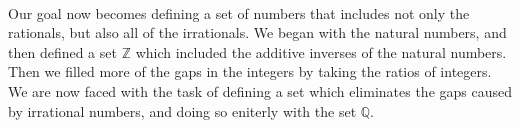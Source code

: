 \documentclass{article}
\newcommand{\Q}{\mathbb{Q}}
\newcommand{\Z}{\mathbb{Z}}
\theoremstyle{definition}
\begin{document}
	\begin{figure}[h]
	\centering
			\caption{}
\end{figure}\\
Our goal now becomes defining a set of numbers that includes not only the rationals, but also all of the irrationals. We began with the natural numbers, and then defined a set $ \Z $ which included the additive inverses of the natural numbers. Then we filled more of the gaps in the integers by taking the ratios of integers. We are now faced with the task of defining a set which eliminates the gaps caused by irrational numbers, and doing so eniterly with the set $ \Q $. 
\end{document}
